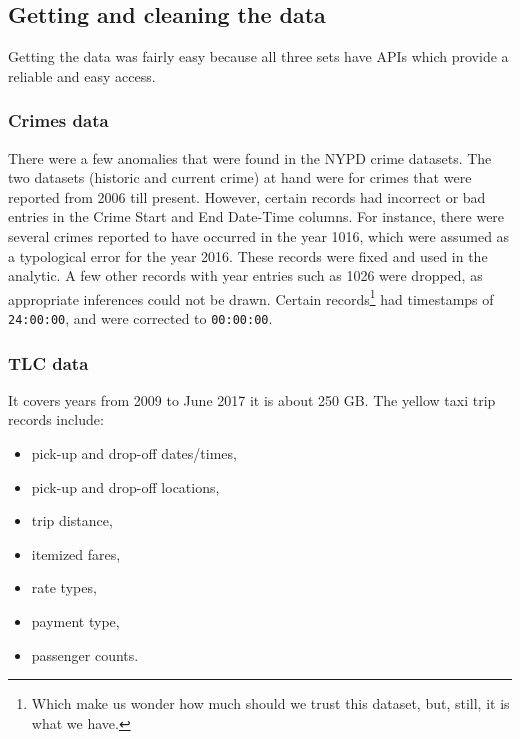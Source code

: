 \documentclass{sigkddExp}
\begin{document}
\subsection{Getting and cleaning the data}

Getting the data was fairly easy because all three sets have APIs which provide a reliable and easy access.

\subsubsection{Crimes data}
There were a few anomalies that were found in the NYPD crime datasets. The two datasets (historic and current crime) at hand were for crimes that were reported from 2006 till present. However, certain records had incorrect or bad entries in the Crime Start and End Date-Time columns. For instance, there were several crimes reported to have occurred in the year 1016, which were assumed as a typological error for the year 2016. These records were fixed and used in the analytic. A few other records with year entries such as 1026 were dropped, as appropriate inferences could not be drawn. Certain records\footnote{Which make us wonder how much should we trust this dataset, but, still, it is what we have.} had timestamps of \texttt{24:00:00}, and were corrected to \texttt{00:00:00}.

\subsubsection{TLC data}

It covers years from 2009 to June 2017  it is about 250 GB. The yellow taxi trip records include:

\begin{itemize}
\item pick-up and drop-off dates/times, 
\item pick-up and drop-off locations, 
\item trip distance,
\item itemized fares, 
\item rate types, 
\item payment type, 
\item passenger counts. 
\end{itemize}
\end{document}
